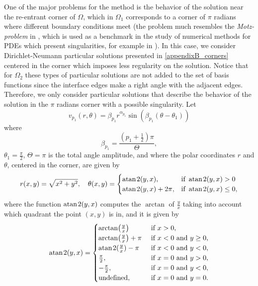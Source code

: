 One of the major problems for the method is the behavior of the solution near the re-entrant corner of \(\Omega\), which in \(\Omega_1\) corresponds to a corner of \(\pi\) radians where different boundary conditions meet (the problem much resembles the \textit{Motz-problem} in \cite{motz1947treatment}, which is used as a benchmark in the study of numerical methods for \acp{PDE} which present singularities, for example in \cite{antunes2010meshfree}).
In this case, we consider Dirichlet-Neumann particular solutions presented in \ref{appendixB_corners} centered in the corner which imposes less regularity on the solution. Notice that for \(\Omega_2\) these types of particular solutions are not added to the set of basis functions since the interface edges make a right angle with the adjacent edges.
Therefore, we only consider particular solutions that describe the behavior of the solution in the \(\pi\) radians corner with a possible singularity. Let
\begin{equation}\label{pat_sol_L_shape_rect}
    v_{p_1}(r, \theta) = \beta_{p_1} r^{\alpha_{p_1}} \sin(\beta_{p_1}(\theta - \theta_1))
\end{equation}
where
\[
    \beta_{p_1} = \frac{(p_1+\frac{1}{2})\pi}{\Theta},
\]
\(\theta_1 = \frac{\pi}{2}\), \(\Theta = \pi\) is the total angle amplitude, and where the polar coordinates \(r\) and \(\theta\), centered in the corner, are given by
\[
    r(x,y) = \sqrt{x^2+y^2}, \quad \theta(x,y)=\begin{cases}
        \operatorname{atan \mspace{2mu} 2}(y,x),& \text{if } \operatorname{atan \mspace{2mu} 2}(y,x)>0\\
        \operatorname{atan \mspace{2mu} 2}(y,x)+2\pi,& \text{if } \operatorname{atan \mspace{2mu} 2}(y,x)\leq0,
    \end{cases}
\]
where the function \(\operatorname{atan \mspace{2mu} 2}(y,x)\) computes the \(\arctan\) of \(\frac{y}{x}\) taking into account which quadrant the point \((x, y)\) is in, and it is given by
\[
    \operatorname{atan \mspace{2mu} 2}(y, x) = \begin{cases}
        \arctan(\frac{y}{x}) &\text{ if } x >0,\\
        \arctan(\frac{y}{x}) + \pi &\text{ if } x < 0 \text{ and } y \geq 0,\\
        \operatorname{atan \mspace{2mu} 2}(\frac{y}{x}) -\pi &\text{ if } x < 0 \text{ and } y < 0,\\
        \frac{\pi}{2}, &\text{ if } x = 0 \text{ and } y > 0, \\
        -\frac{\pi}{2}, &\text{ if } x = 0 \text{ and } y < 0, \\
        \text{undefined}, &\text{ if } x = 0 \text{ and } y = 0.
    \end{cases}
\]
